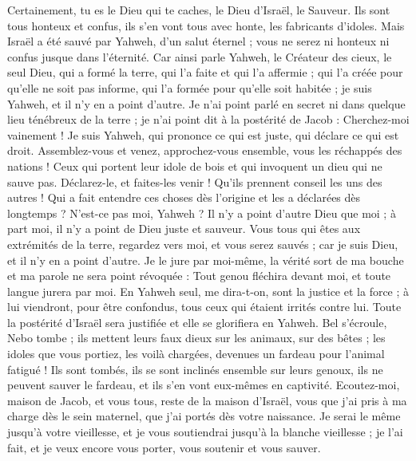 \begin{multicols}{2}
Certainement, tu es le Dieu qui te caches, le Dieu d'Israël, le Sauveur.
Ils sont tous honteux et confus, ils s'en vont tous avec honte, les fabricants d'idoles.
Mais Israël a été sauvé par Yahweh, d'un salut éternel ; vous ne serez ni honteux ni confus jusque dans l'éternité.
Car ainsi parle Yahweh, le Créateur des cieux, le seul Dieu, qui a formé la terre, qui l'a faite et qui l'a affermie ; qui l'a créée pour qu'elle ne soit pas informe, qui l'a formée pour qu'elle soit habitée ; je suis Yahweh, et il n'y en a point d'autre.
Je n'ai point parlé en secret ni dans quelque lieu ténébreux de la terre ; je n'ai point dit à la postérité de Jacob : Cherchez-moi vainement ! Je suis Yahweh, qui prononce ce qui est juste, qui déclare ce qui est droit.
Assemblez-vous et venez, approchez-vous ensemble, vous les réchappés des nations ! Ceux qui portent leur idole de bois et qui invoquent un dieu qui ne sauve pas.
Déclarez-le, et faites-les venir ! Qu'ils prennent conseil les uns des autres ! Qui a fait entendre ces choses dès l'origine et les a déclarées dès longtemps ? N'est-ce pas moi, Yahweh ? Il n'y a point d'autre Dieu que moi ; à part moi, il n'y a point de Dieu juste et sauveur.
Vous tous qui êtes aux extrémités de la terre, regardez vers moi, et vous serez sauvés ; car je suis Dieu, et il n'y en a point d'autre.
Je le jure par moi-même, la vérité sort de ma bouche et ma parole ne sera point révoquée : Tout genou fléchira devant moi, et toute langue jurera par moi.
En Yahweh seul, me dira-t-on, sont la justice et la force ; à lui viendront, pour être confondus, tous ceux qui étaient irrités contre lui.
Toute la postérité d'Israël sera justifiée et elle se glorifiera en Yahweh.
\VerseOne{}Bel s'écroule, Nebo tombe ; ils mettent leurs faux dieux sur les animaux, sur des bêtes ; les idoles que vous portiez, les voilà chargées, devenues un fardeau pour l'animal fatigué !
Ils sont tombés, ils se sont inclinés ensemble sur leurs genoux, ils ne peuvent sauver le fardeau, et ils s'en vont eux-mêmes en captivité.
Ecoutez-moi, maison de Jacob, et vous tous, reste de la maison d'Israël, vous que j'ai pris à ma charge dès le sein maternel, que j'ai portés dès votre naissance.
Je serai le même jusqu'à votre vieillesse, et je vous soutiendrai jusqu'à la blanche vieillesse ; je l'ai fait, et je veux encore vous porter, vous soutenir et vous sauver.

\end{multicols}
